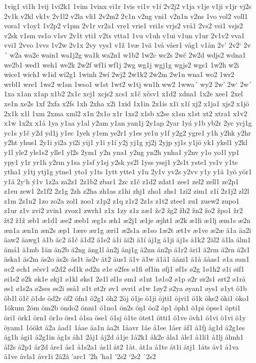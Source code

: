 1vig1
vi1h
1vij
1vi2k1
1vim
1vinx
vi1r
1vis
vi1v
v1í
2v2j2
v1ja
v1je
v1ji
v1jr
vj2s
2v1k
v2kl
vk1v
2v1l2
v2la
vli1
2v2m2
2v1n
v2ng
vni1
v2n1n
v2ns
1vo
vol2
voll1
vora1
v1oy1
1v2p2
v1pm
2v1r
vr2a1
vre1
vrie1
vri1s
vrjs2
vrå1
2vs2
vsi1
vsjs2
v2sk
v1sm
vs1o
v1sv
2v1t
vti1
v2ts
vtta1
1vu
v1uh
v1ui
v1un
v1ur
2v1v2
vva1
vvi1
2vvo
1vvs
1v2w
2v1x
2vy
vys1
v1ž
1væ
1vä
1vå
våer1
våg1
v1ån
2v'
2v2`
2v´
w2a
wa2e
wain1
wa1j2g
wa1k
wa2n1
w1b2
1w2c
wc2s
2wč
2w2d
wdjs2
wdna1
we2b1
wed1
weh1
we2k
2w2f
wf1i
wf1j
2wg
wg1j
wgj1g
wgjs2
wgs1
1w2h
w2i
wice1
wich1
w1id
wi2g1
1winh
2wí
2wj2
2w1k2
2w2m
2w1n
wna1
wo2
1wr2
wrbl1
wre1
1ws2
w1sn
1wso1
w1st
1wt2
w1tj
wu1h
ww2
1wwa´
wy2
2w'
2w`
2w´
1xa
x1an
x1ap
x1b2
2x1c
xcj1
xcjs2
xcs1
x1č
xčsv1
x1d2
xdna1
1x2e
xee1
2xel
xe1n
xe2s
1xf
2xfa
x2fs
1xh
2xha
x2i
1xid
1x1in
2x1is
x1ï
x1í
xj2
x1ja1
xjs2
x1jö
2x1k
x1l
1xm
2xma
xml2
x1n
2x1o
x1r
1xs2
x1sb
x2se
x1sn
x1st
xt2
xtra1
x1v2
x1w
1x2x
x1å
1ya
y1aa
y1al
y2am
y1an
yan1j
2y1ap
2yar
1yá
y1b
yb2r
2yc
ycj1g
yc1s
y1č
y2d
yd1j
y1ec
1yeh
y1em
ye2r1
y1es
ye1u
y1f
y2g2
ygre1
y1h
y2hk
y2hr
y2ht
yhus1
2y1i
yi2a
yi2i
yij1
y1ï
y1í
y2j
yj1g
yj2j
2yjp
yj1s
y1jö
yk1
ykel1
y2kl
y1l
yle2
yle1s2
ylle1
yl2s
2ym1
y2n
yna1
y2ng
yn2h
ynha1
y2nv
y1o
yo1l
yp1
ypy1
y1r
yr1h
y2rm
y1sa
y1sf
y1sj
y2sk
ys2l
1yss
yssj1
y2s1t
yste1
ys1v
y1te
ytha1
y1tj
ytj1g
ytne1
yto1
y1ts
1ytt
ytte1
y1u
2y1v
yv2s
y2vv
y1y
y1ä
1yö
yör1
y1å
2y`h
ý1v
1z2a
za2z1
2z1b2
zbar1
2zc
z1č
z1d2
zdat1
zee1
zel2
zell1
ze2p1
z1eu
zew1
2z1f2
2z1g
2zh
z2ha
zh1as
z1hi
zhj1
zho1
zhs1
1zi2
zim1
z1í
2z1j2
zl2l
z1m
2z1n2
1zo
zo2a
zol1
zoo1
z1p2
z1q
z1r2
2z1s
z1t2
ztee1
zu1
zuew2
zupo1
z1ur
z1v
zvi2
zvin1
zvox1
zwrh1
z1x
1zy
z1z
zæ1
žc2
žg2
žh2
žn2
žo2
žpo1
žr2
žt2
ž1ž
æb1
æ1d1
æe2
æeb1
æg1s
æh1
æ2j1
æ1je
æjht1
æ2k
æ1li
æ1lj
æm1s
æ2n
æn1a
æn1n
æn2s
æp1
1ære
ær1g
æri1
æ2s1a
æ1so
1æ2t
æt1v
æ1ve
æ2æ
ä1a
äa2i
äaw2
äawg1
ä1b
äc2
ä1č
ä1d2
ä1e2
ä1i
äi2i
ä1í
äj1g
ä1ji
äj1s
ä1k2
2äl2
ä1la
älm1
ämá1
ä1mb
1än
än2b
ä2ng
äng1l
än2j
änj1g
ä2nn
än2p
ä1r2
äri1
ä2rm
ä2rn
ä2s1
äska1
äs2m
äs2o
äs2s
äs1t
äs2v
ät2
äus1
ä1v
ä1w
ä1ä1
ääni1
ä1å
äåas1
ø1a
øan1
øc2
øch1
øčsv1
ø2d2
ød1k
ød2n
ø1e
ø2fes
ø1fi
øf1in
øfj1
øf1s
ø2g
1ø1h2
ø1i
øif1
øi1s2
ø2k
øk1e
økj1
ø1kl
øks1
2ø1l
øl1s
øm1
ø1nt
1ø1o2
ø1p
ø2r
ør2s1
ørt2
ø1rå
øs1
ø1s2a
ø2ses
øs2i
øså1
ø1t
øt2r
øv1
øvri1
ø1w
1øy2
ø2ya
øyan1
øys1
ø1yt
ö1b
öb1l
ö1č
ö1de
öd2r
öf2
öfn1
ö2g1
öh2
2öj
ö1je
ö1ji
öjti1
öjvi1
ö1k
öke2
öki1
öko1
1ökum
2öm
öm2b
öndo2
önni1
ö1no1
ön2s
öŋ1
öo2
öp1
öph1
ö1pi
öpse1
öpti1
öri1
örk1
örn1
ör1o
örs1
ö1sa
öse1
ö1sj
ö1te
ötet1
ötti1
ö1ve
övh1
ö1vi
ö1vï
ö1y
öyam1
1öökt
å2a
åad1
1åae
åa1n
åa2t
1åavr
1åe
å1ee
1åer
åf1
å1fj
åg1d
å2g1es
åg1h
ågi1
å2g1in
åg1s
åh1
2åj1
åj2d
å1je
1å2k1
åk2e
åla1
åle1
å1li1
å1lj
ålmh1
ål2s
å2p1
år2d
åre1
ås1
å1s2a1
ås1l
åt2
1åt.
åt1a
å1te
åt1i
åtj1
1åts
åv1
å1va
å1ve
åvla1
åvr1i
2å2å
'arc1
'2h
'ha1
'2s2
`2s2
´2s2
